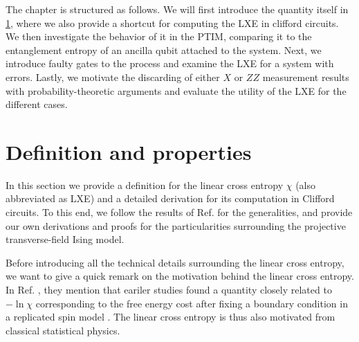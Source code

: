 
The chapter is structured as follows. We will first introduce the quantity
itself in \cref{sec:lxe-defn}, where we also provide a shortcut for computing
the LXE in clifford circuits. We then investigate the behavior of it in the
PTIM, comparing it to the entanglement entropy of an ancilla qubit attached to
the system. Next, we introduce faulty gates to the process and examine the LXE
for a system with errors. Lastly, we motivate the discarding of either $X$ or
$ZZ$ measurement results with probability-theoretic arguments and evaluate the
utility of the LXE for the different cases.
\newpage
\section{Definition and properties}\label{sec:lxe-defn}
In this section we provide a definition for the linear cross entropy $\chi$
(also abbreviated as LXE)
and a detailed derivation for its computation in Clifford circuits. To this
end, we follow the results of Ref.
\cite{liCrossEntropyBenchmark2023,tikhanovskayaUniversalityCrossEntropy2023} for the
generalities, and provide our own derivations and proofs for the
particularities surrounding the projective transverse-field Ising model.

Before introducing all the technical details surrounding the linear cross
entropy, we want to give a quick remark on the motivation behind the linear
cross entropy. In Ref.
\cite{liCrossEntropyBenchmark2023}, they mention that eariler studies found a
quantity closely related to $-\ln\chi$ corresponding to the free energy cost
after fixing a boundary condition in a replicated spin model
\cite{liCrossEntropyBenchmark2023,baoTheoryPhaseTransition2020,jianMeasurementinducedCriticalityRandom2020,nahumOperatorSpreadingRandom2018,zhouEmergentStatisticalMechanics2019}.
The linear cross entropy is thus also motivated from classical statistical physics.


